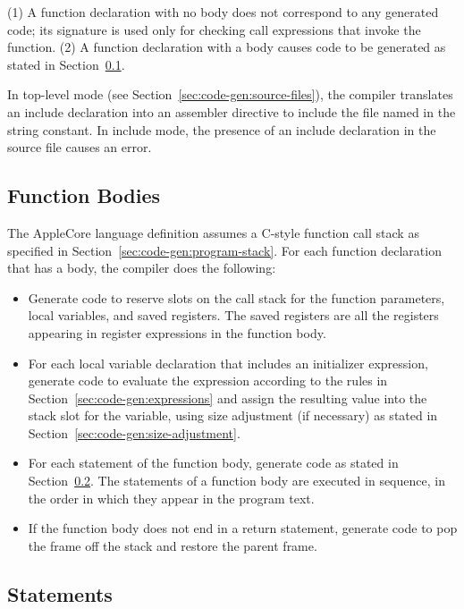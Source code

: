\documentclass[10pt]{article}
\begin{document}
 (1) A function declaration with no
body does not correspond to any generated code; its signature is used
only for checking call expressions that invoke the function.  (2) A
function declaration with a body causes code to be generated as stated
in Section~\ref{sec:code-gen:fn-bodies}.

  In top-level mode (see
Section~\ref{sec:code-gen:source-files}), the compiler translates an
include declaration into an assembler directive to include the file
named in the string constant.  In include mode, the presence of an
include declaration in the source file causes an error.

\subsection{Function Bodies}
\label{sec:code-gen:fn-bodies}

The AppleCore language definition assumes a C-style function call
stack as specified in Section~\ref{sec:code-gen:program-stack}.  For
each function declaration that has a body, the compiler does the
following:
%
\begin{itemize}
%
\item Generate code to reserve slots on the call stack for the
  function parameters, local variables, and saved registers.  The
  saved registers are all the registers appearing in register
  expressions in the function body.
%
\item For each local variable declaration that includes an initializer
  expression, generate code to evaluate the expression according to
  the rules in Section~\ref{sec:code-gen:expressions} and assign the
  resulting value into the stack slot for the variable, using size
  adjustment (if necessary) as stated in
  Section~\ref{sec:code-gen:size-adjustment}.
%
\item For each statement of the function body, generate code as stated
  in Section~\ref{sec:code-gen:statements}.  The statements of a
  function body are executed in sequence, in the order in which they
  appear in the program text.
%
\item If the function body does not end in a return statement,
  generate code to pop the frame off the stack and restore the parent
  frame.
%
\end{itemize}


\subsection{Statements}
\label{sec:code-gen:statements}
\end{document}
